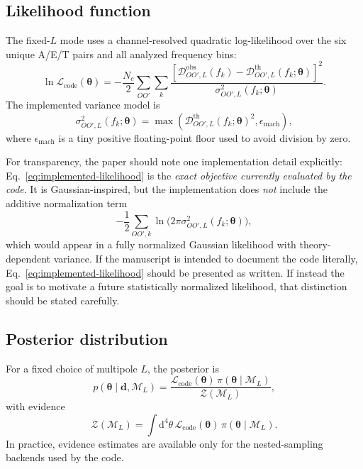 \documentclass[11pt]{article}
\newcommand{\Dobs}{\mathcal{D}^{\mathrm{obs}}}
\newcommand{\Dth}{\mathcal{D}^{\mathrm{th}}}
\newcommand{\vect}[1]{\bm{#1}}
\newcommand{\dd}{\mathrm{d}}
\begin{document}
\subsection{Likelihood function}

The fixed-$L$ mode uses a channel-resolved quadratic log-likelihood over the six unique A/E/T pairs and all analyzed frequency bins:
\begin{equation}
  \ln \mathcal{L}_{\mathrm{code}}(\vect{\theta})
  =
  -\frac{N_c}{2}
  \sum_{OO'}
  \sum_{k}
  \frac{
    \left[
      \Dobs_{OO',L}(f_k)
      -
      \Dth_{OO',L}(f_k;\vect{\theta})
    \right]^2
  }{
    \sigma^2_{OO',L}(f_k;\vect{\theta})
  }.
  \label{eq:implemented-likelihood}
\end{equation}
The implemented variance model is
\begin{equation}
  \sigma^2_{OO',L}(f_k;\vect{\theta})
  =
  \max\!\left(
    \Dth_{OO',L}(f_k;\vect{\theta})^2,
    \epsilon_{\mathrm{mach}}
  \right),
  \label{eq:implemented-variance}
\end{equation}
where $\epsilon_{\mathrm{mach}}$ is a tiny positive floating-point floor used to avoid division by zero.

For transparency, the paper should note one implementation detail explicitly: Eq.~\eqref{eq:implemented-likelihood} is the \emph{exact objective currently evaluated by the code}. It is Gaussian-inspired, but the implementation does \emph{not} include the additive normalization term
\begin{equation}
  -\frac{1}{2}\sum_{OO',k}\ln\!\big(2\pi \sigma^2_{OO',L}(f_k;\vect{\theta})\big),
\end{equation}
which would appear in a fully normalized Gaussian likelihood with theory-dependent variance. If the manuscript is intended to document the code literally, Eq.~\eqref{eq:implemented-likelihood} should be presented as written. If instead the goal is to motivate a future statistically normalized likelihood, that distinction should be stated carefully.

\subsection{Posterior distribution}

For a fixed choice of multipole $L$, the posterior is
\begin{equation}
  p(\vect{\theta}\mid \vect{d}, \mathcal{M}_L)
  =
  \frac{
    \mathcal{L}_{\mathrm{code}}(\vect{\theta})\,
    \pi(\vect{\theta}\mid \mathcal{M}_L)
  }{
    \mathcal{Z}(\mathcal{M}_L)
  },
\end{equation}
with evidence
\begin{equation}
  \mathcal{Z}(\mathcal{M}_L)
  =
  \int \dd^4\theta\,
  \mathcal{L}_{\mathrm{code}}(\vect{\theta})\,
  \pi(\vect{\theta}\mid \mathcal{M}_L).
\end{equation}
In practice, evidence estimates are available only for the nested-sampling backends used by the code.
\end{document}

